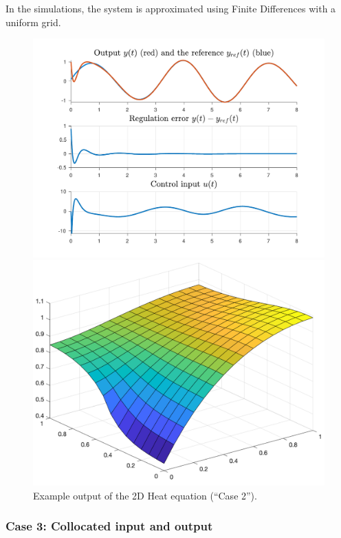 \documentclass[11pt, a4paper]{amsart}
\theoremstyle{definition}
\numberwithin{equation}{section}
\begin{document}
In the simulations, the system is approximated using Finite Differences with a uniform grid. 


\begin{figure}[h!]
  \begin{minipage}{0.46\linewidth}
    \includegraphics[width=0.95\linewidth]{H2D2outputs.pdf}
  \end{minipage}
  \hfill
  \begin{minipage}{0.52\linewidth}
    \includegraphics[width=0.9\linewidth]{H2D2surf.png}
  \end{minipage}
\caption{Example output of the 2D Heat equation (``Case 2'').}
  \label{fig:2Dheat2}
\end{figure}

\medskip

\subsubsection*{Case 3: Collocated input and output}
~\\[-1ex]
\end{document}
